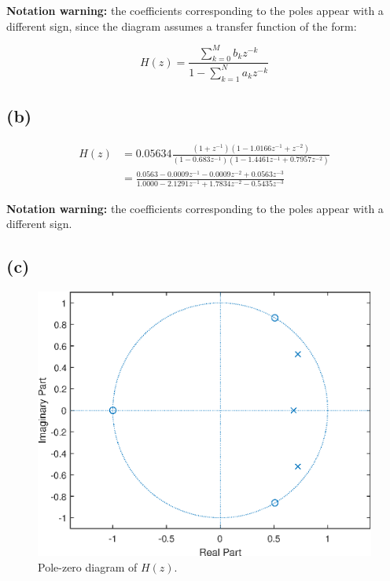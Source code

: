 \documentclass{article}
\begin{document}
\begin{figure}[!h]
	\resizebox{0.9\textwidth}{!}{}
\end{figure}
\noindent\textbf{Notation warning:} the coefficients corresponding to the poles appear with a different sign, since the diagram assumes a transfer function of the form:

\begin{equation}
	H(z) = \frac{\sum_{k=0}^M b_kz^{-k}}{1-\sum_{k=1}^N a_kz^{-k}}
\end{equation}

\subsection{(b)}

\begin{align} \nonumber
H(z) &= 0.05634\frac{(1+z^{-1})(1 -1.0166z^{-1} + z^{-2})}{(1-0.683z^{-1})(1 -1.4461z^{-1} + 0.7957z^{-2})} \\
&= \frac{0.0563 -0.0009z^{-1}   -0.0009z^{-2}   + 0.0563z^{-3}}{1.0000   -2.1291z^{-1}    +1.7834z^{-2}   -0.5435z^{-3}}
\end{align}

\FloatBarrier
\begin{figure}[!h]
	\centering
	\resizebox{0.6\textwidth}{!}{}
\end{figure}
\FloatBarrier

\noindent\textbf{Notation warning:} the coefficients corresponding to the poles appear with a different sign.
\subsection{(c)}

\FloatBarrier
\begin{figure}[h!]
	\centering
	\includegraphics[scale=0.7]{figs/hw04q6_zplane.eps}
	\caption{Pole-zero diagram of $H(z)$.}
\end{figure}
\FloatBarrier
\end{document}
